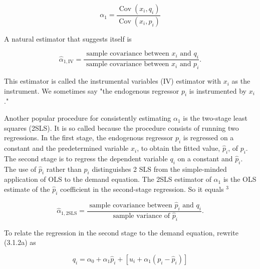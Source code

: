 \documentclass[10pt]{article}
\begin{document}
\begin{equation*}
\alpha_{1}=\frac{\operatorname{Cov}\left(x_{i}, q_{i}\right)}{\operatorname{Cov}\left(x_{i}, p_{i}\right)} \tag{3.1.11}
\end{equation*}


A natural estimator that suggests itself is


\begin{equation*}
\hat{\alpha}_{1, \mathrm{IV}}=\frac{\text { sample covariance between } x_{i} \text { and } q_{i}}{\text { sample covariance between } x_{i} \text { and } p_{i}} . \tag{3.1.12}
\end{equation*}


This estimator is called the instrumental variables (IV) estimator with $x_{i}$ as the instrument. We sometimes say "the endogenous regressor $p_{i}$ is instrumented by $x_{i}$."

Another popular procedure for consistently estimating $\alpha_{1}$ is the two-stage least squares (2SLS). It is so called because the procedure consists of running two\\
regressions. In the first stage, the endogenous regressor $p_{i}$ is regressed on a constant and the predetermined variable $x_{i}$, to obtain the fitted value, $\hat{p}_{i}$, of $p_{i}$. The second stage is to regress the dependent variable $q_{i}$ on a constant and $\hat{p}_{i}$. The use of $\hat{p}_{i}$ rather than $p_{i}$ distinguishes 2 SLS from the simple-minded application of OLS to the demand equation. The 2SLS estimator of $\alpha_{1}$ is the OLS estimate of the $\hat{p}_{i}$ coefficient in the second-stage regression. So it equals ${ }^{3}$


\begin{equation*}
\hat{\alpha}_{1,2 \mathrm{SLS}}=\frac{\text { sample covariance between } \hat{p}_{i} \text { and } q_{i}}{\text { sample variance of } \hat{p}_{i}} . \tag{3.1.13}
\end{equation*}


To relate the regression in the second stage to the demand equation, rewrite (3.1.2a) as


\begin{equation*}
q_{i}=\alpha_{0}+\alpha_{1} \hat{p}_{i}+\left[u_{i}+\alpha_{1}\left(p_{i}-\hat{p}_{i}\right)\right] \tag{3.1.14}
\end{equation*}
\end{document}
